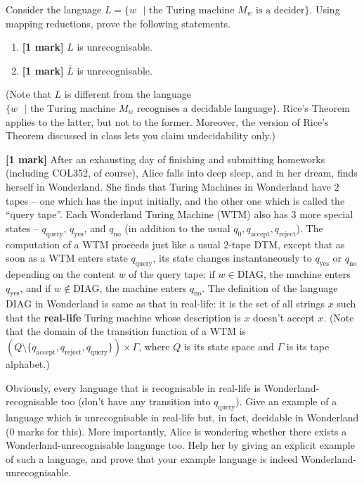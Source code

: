 \documentclass[10pt,addpoints]{exam}
\begin{document}
\begin{questions}


\newpage
\question Consider the language $L=\{w\text{ }|\text{ the Turing machine }M_w\text{ is a decider}\}$. Using mapping reductions, prove the following statements.
\begin{enumerate}
\item \textbf{[1 mark]} $L$ is unrecognisable.
\item \textbf{[1 mark]} $\overline{L}$ is unrecognisable.
\end{enumerate}
(Note that $L$ is different from the language $\{w\text{ }|\text{ the Turing machine }M_w\text{ recognises a decidable language}\}$. Rice's Theorem applies to the latter, but not to the former. Moreover, the version of Rice's Theorem discussed in class lets you claim undecidability only.)



\newpage

\question\textbf{[1 mark]} After an exhausting day of finishing and submitting homeworks (including COL352, of course), Alice falls into deep sleep, and in her dream, finds herself in Wonderland. She finds that Turing Machines in Wonderland have $2$ tapes -- one which has the input initially, and the other one which is called the ``query tape''. Each Wonderland Turing Machine (WTM) also has $3$ more special states -- $q_{\text{query}}$, $q_{\text{yes}}$, and $q_{\text{no}}$ (in addition to the usual $q_0,q_{\text{accept}},q_{\text{reject}}$). The computation of a WTM proceeds just like a usual $2$-tape DTM, except that as soon as a WTM enters state $q_{\text{query}}$, its state changes instantaneously to $q_{\text{yes}}$ or $q_{\text{no}}$ depending on the content $w$ of the query tape: if $w\in\text{DIAG}$, the machine enters $q_{\text{yes}}$, and if  $w\notin\text{DIAG}$, the machine enters $q_{\text{no}}$. The definition of the language $\text{DIAG}$ in Wonderland is same as that in real-life: it is the set of all strings $x$ such that the \textbf{real-life} Turing machine whose description is $x$ doesn't accept $x$. (Note that the domain of the transition function of a WTM is $(Q\setminus\{q_{\text{accept}},q_{\text{reject}},q_{\text{query}}\})\times\Gamma$, where $Q$ is its state space and $\Gamma$ is its tape alphabet.)

Obviously, every language that is recognisable in real-life is Wonderland-recognisable too (don't have any transition into $q_{\text{query}}$). Give an example of a language which is unrecognisable in real-life but, in fact, decidable in Wonderland (0 marks for this). More importantly, Alice is wondering whether there exists a Wonderland-unrecognisable language too. Help her by giving an explicit example of such a language, and prove that your example language is indeed Wonderland-unrecognisable.



\end{questions}
\end{document}
